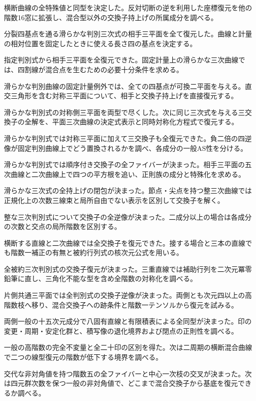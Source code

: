 \documentclass[11pt,a4paper]{ltjsarticle}
\begin{document}
横断曲線の全特殊値と同型を決定した。反対切断の逆を利用した座標復元を他の階数16窓に拡張し、混合型以外の交換子持上げの所属成分を調べる。

分裂四基点を通る滑らかな判別三次式の相手三平面を全て復元した。曲線と計量の相対位置を固定したときに使える長さ四の基点を決定する。

指定判別式から相手三平面を全復元できた。固定計量上の滑らかな三次曲線では、四割線が混合点を生むための必要十分条件を求める。

滑らかな判別曲線の固定計量例外では、全ての四基点が可換二平面を与える。直交三角形を含む対称三平面について、相手と交換子持上げを直接復元する。

滑らかな判別式の対称側三平面を両型で尽くした。次に同じ三次式を与える三交換子の全解を、平面三次曲線の決定式表示と同時対称化方程式で復元する。

滑らかな判別式では対称三平面に加えて三交換子も全復元できた。負二倍の四逆像が固定判別曲線上でどう置換されるかを調べ、各成分の一般AS性を分ける。

滑らかな判別式では順序付き交換子の全ファイバーが決まった。相手三平面の五次曲線と二次曲線上で四つの平方根を追い、正則族の成分と特殊化を求める。

滑らかな三次式の全持上げの閉包が決まった。節点・尖点を持つ整三次曲線では正規化上の次数三線束と局所自由でない表示を区別して交換子を解く。

整な三次判別式について交換子の全逆像が決まった。二成分以上の場合は各成分の次数と交点の局所階数を区別する。

横断する直線と二次曲線では全交換子を復元できた。接する場合と三本の直線でも階数一補正の有無と被約行列式の核次元公式を用いる。

全被約三次判別式の交換子復元が決まった。三重直線では補助行列を二次元冪零鉛筆に直し、三角化不能な型を含め全階数の対称化を調べる。

片側共通三平面では全判別式の交換子逆像が決まった。両側とも次元四以上の高階数枝へ移り、混合交換子への跡条件と階数一テンソルから復元を試みる。

両側一般の十五次元成分で八固有直線と有限積表による全同型が決まった。印の変更・周期・安定化群と、積写像の退化境界および閉点の正則性を調べる。

一般の高階数の完全不変量と全二十印の区別を得た。次は二周期の横断混合曲線で二つの線型復元の階数が低下する境界を調べる。

交代な非対角値を持つ階数五の全ファイバーと中心一次枝の交叉が決まった。次は四元群次数を保つ一般の非対角値で、どこまで混合交換子から基底を復元できるか調べる。
\end{document}
